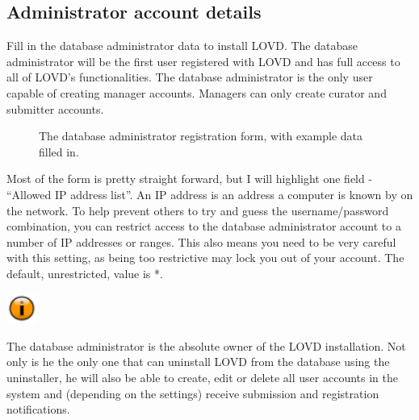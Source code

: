 \documentclass[a4paper,oneside,openany,12pt]{memoir}
\newlength{\infoboxlength}
\newlength{\infoboxinnerlength}
\newenvironment{infotable}
  {\begin{lrbox}{\infobox}%
    \begin{minipage}[t]{1.5cm}
      \centering
      \vspace{0pt}
      \includegraphics[width=1cm,height=1cm]{lovd_information.png}
    \end{minipage}
   \begin{minipage}[t]{\infoboxlength}\vspace{5pt}\begin{minipage}{\infoboxinnerlength}}
  {\vspace{6pt}\end{minipage}\end{minipage}\end{lrbox}%
   \begin{center}
   \fcolorbox{black}{LOVDlight}{\usebox{\infobox}}
   \end{center}}
\begin{document}
\subsection{Administrator account details}
Fill in the database administrator data to install LOVD.
The database administrator will be the first user registered with LOVD and has full access to all of LOVD's functionalities.
The database administrator is the only user capable of creating manager accounts.
Managers can only create curator and submitter accounts.

\begin{figure}[ht]
  \begin{shaded}
  \caption{The database administrator registration form, with example data filled in.}
  \end{shaded}
\end{figure}

Most of the form is pretty straight forward, but I will highlight one field - ``Allowed IP address list''.
An IP address is an address a computer is known by on the network.
To help prevent others to try and guess the username/password combination,
you can restrict access to the database administrator account to a number of IP addresses or ranges.
This also means you need to be very careful with this setting, as being too restrictive may lock you out of your account.
The default, unrestricted, value is *.

\begin{infotable}
The database administrator is the absolute owner of the LOVD installation.
Not only is he the only one that can uninstall LOVD from the database using the uninstaller,
he will also be able to create, edit or delete all user accounts in the system and
(depending on the settings) receive submission and registration notifications.
\end{infotable}
\end{document}

